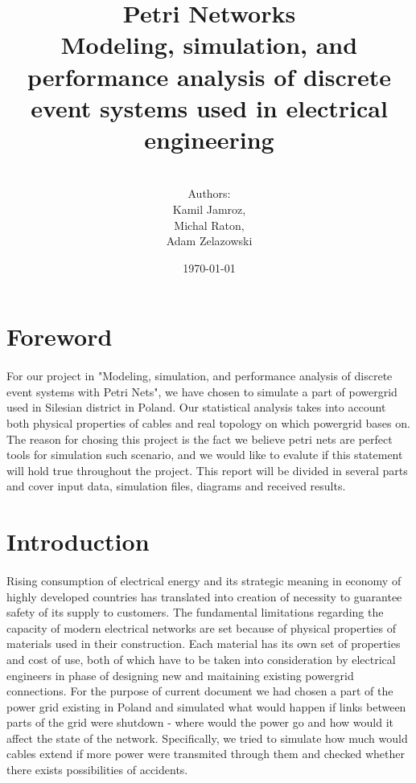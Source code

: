 \documentclass[a4paper]{article}
\title{Petri Networks\\Modeling, simulation, and performance analysis of discrete event systems used in electrical engineering}
\author{\\Authors:\\ Kamil Jamroz,\\ Michal Raton,\\ Adam Zelazowski\\}
\date{\today}
\begin{document}
\maketitle

\clearpage

\tableofcontents

\clearpage

%
\section{Foreword}  

\paragraph{}
For our project in "Modeling, simulation, and performance analysis of discrete event systems with Petri Nets", we have chosen to simulate a part of powergrid used in Silesian district in Poland. Our statistical analysis takes into account both physical properties of cables and real topology on which powergrid bases on. The reason for chosing this project is the fact we believe petri nets are perfect tools for simulation such scenario, and we would like to evalute if this statement will hold true throughout the project. This report will be divided in several parts and cover input data, simulation files, diagrams and received results.

%
\section{Introduction}   

\paragraph{}
Rising consumption of electrical energy and its strategic meaning in economy of highly developed countries has translated into creation of necessity to guarantee safety of its supply to customers. The fundamental limitations regarding the capacity of modern electrical networks are set because of physical properties of materials used in their construction. Each material has its own set of properties and cost of use, both of which have to be taken into consideration by electrical engineers in phase of designing new and maitaining existing powergrid connections. For the purpose of current document we had chosen a part of the power grid existing in Poland and simulated what would happen if links between parts of the grid were shutdown - where would the power go and how would it affect the state of the network. Specifically, we tried to simulate how much would cables extend if more power were transmited through them and checked whether there exists possibilities of accidents.
\end{document}
